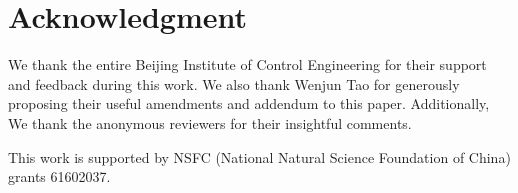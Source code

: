 \documentclass[10pt,conference]{IEEEtran}
\begin{document}


\section*{Acknowledgment}
 We thank the entire Beijing Institute of Control Engineering for their support and feedback during this work. We also thank Wenjun Tao for generously proposing their useful amendments and addendum to this paper. Additionally, We thank the anonymous reviewers for their insightful comments.

 This work is supported by NSFC (National Natural Science Foundation of China) grants 61602037.





%
%
%
\end{document}
